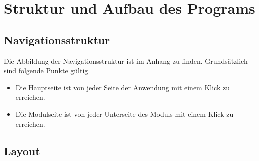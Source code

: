 \chapter{Struktur und Aufbau des Programs}

%
%
%
\section{Navigationsstruktur}
\label{sec:navigation}
Die Abbildung der Navigationsstruktur ist im Anhang zu finden.
Grundsätzlich sind folgende Punkte gültig
\begin{itemize}
  \item Die Hauptseite ist von jeder Seite der Anwendung mit einem Klick zu erreichen.
  \item Die Modulseite ist von jeder Unterseite des Moduls mit einem Klick zu erreichen.
\end{itemize}

%
%
%
\section{Layout}
\label{sec:layout}

